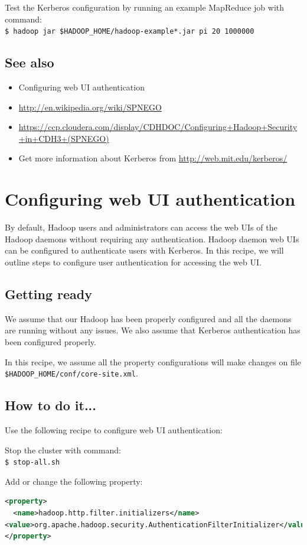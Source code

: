 Test the Kerberos configuration by running an example MapReduce job with command: \\
\verb|$ hadoop jar $HADOOP_HOME/hadoop-example*.jar pi 20 1000000|
\subsection*{See also}
\begin{itemize}
  \item Configuring web UI authentication
  \item \url{http://en.wikipedia.org/wiki/SPNEGO}
  \item \url{https://ccp.cloudera.com/display/CDHDOC/Configuring+Hadoop+Security+in+CDH3+(SPNEGO)}
  \item Get more information about Kerberos from \url{http://web.mit.edu/kerberos/}
\end{itemize}

\section{Configuring web UI authentication}
By default, Hadoop users and administrators can access the web UIs of the Hadoop daemons without requiring any authentication. Hadoop daemon web UIs can be configured to authenticate users with Kerberos. In this recipe, we will outline steps to configure user authentication for accessing the web UI.
\subsection*{Getting ready}
We assume that our Hadoop has been properly configured and all the daemons are running without any issues. We also assume that Kerberos authentication has been configured properly.

In this recipe, we assume all the property configurations will make changes on file \verb|$HADOOP_HOME/conf/core-site.xml|.
\subsection*{How to do it...}
Use the following recipe to configure web UI authentication:

Stop the cluster with command: \\
\verb|$ stop-all.sh|

Add or change the following property:
\lstset{style=bashstyle}
\begin{lstlisting}[language=XML]
<property>
  <name>hadoop.http.filter.initializers</name>
<value>org.apache.hadoop.security.AuthenticationFilterInitializer</value>
</property>
\end{lstlisting}

